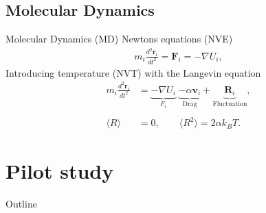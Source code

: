 \documentclass[
	10pt, %
]{beamer}
\renewcommand{\vec}[1]{\mathbf{#1}} %
\begin{document}
\subsection{Molecular Dynamics}
\begin{frame}{Molecular Dynamics (MD)}
	Newtons equations (NVE)
	\begin{align*}
		m_i \frac{d^2 \vec{r}_i}{dt^2} = \vec{F}_i = -\nabla U_i,
	\end{align*}
	Introducing temperature (NVT) with the Langevin equation
	\begin{align*}
		m_i \frac{d^2 \vec{r}_i}{dt^2} &= \underbrace{-\nabla U_i}_{F_i} \; \underbrace{-\alpha \vec{v}_i}_{\text{Drag}}  + \underbrace{\vec{R}_i}_{\text{Fluctuation}}, \\
		\\
		\langle R \rangle &= 0, \qquad \langle R^2 \rangle = 2\alpha k_B T.
	\end{align*}
\end{frame}


\section{Pilot study} %
\begin{frame}{Outline}
    \tableofcontents[currentsection]
\end{frame}
\end{document}
